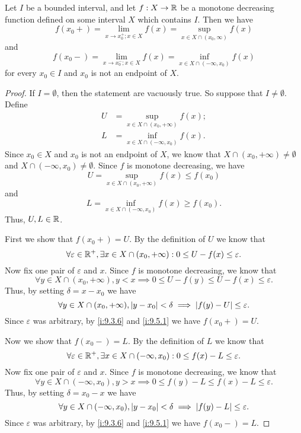 \begin{ac}\label{i:ac:11.8.2}
  Let \(I\) be a bounded interval, and let \(f : X \to \mathbb{R}\) be a monotone decreasing function defined on some interval \(X\) which contains \(I\).
  Then we have
  \[
    f(x_0+) = \lim_{x \to x_0^+ ; x \in X} f(x) = \sup_{x \in X \cap (x_0, \infty)} f(x)
  \]
  and
  \[
    f(x_0-) = \lim_{x \to x_0^- ; x \in X} f(x) = \inf_{x \in X \cap (-\infty, x_0)} f(x)
  \]
  for every \(x_0 \in I\) and \(x_0\) is not an endpoint of \(X\).
\end{ac}

\begin{proof}
  If \(I = \emptyset\), then the statement are vacuously true.
  So suppose that \(I \neq \emptyset\).
  Define
  \begin{align*}
    U & = \sup_{x \in X \cap (x_0, +\infty)} f(x); \\
    L & = \inf_{x \in X \cap (-\infty, x_0)} f(x).
  \end{align*}
  Since \(x_0 \in X\) and \(x_0\) is not an endpoint of \(X\), we know that \(X \cap (x_0, +\infty) \neq \emptyset\) and \(X \cap (-\infty, x_0) \neq \emptyset\).
  Since \(f\) is monotone decreasing, we have
  \[
    U = \sup_{x \in X \cap (x_0, +\infty)} f(x) \leq f(x_0)
  \]
  and
  \[
    L = \inf_{x \in X \cap (-\infty, x_0)} f(x) \geq f(x_0).
  \]
  Thus, \(U, L \in \mathbb{R}\).

  First we show that \(f(x_0+) = U\).
  By the definition of \(U\) we know that
  \[
    \forall \varepsilon \in \mathbb{R}^+, \exists x \in X \cap (x_0, +\infty) : 0 \leq U - f(x) \leq \varepsilon.
  \]
  Now fix one pair of \(\varepsilon\) and \(x\).
  Since \(f\) is monotone decreasing, we know that
  \[
    \forall y \in X \cap (x_0, +\infty), y < x \implies 0 \leq U - f(y) \leq U - f(x) \leq \varepsilon.
  \]
  Thus, by setting \(\delta = x - x_0\) we have
  \[
    \forall y \in X \cap (x_0, +\infty), \left\lvert y - x_0\right\rvert < \delta \implies \left\lvert f(y) - U\right\rvert \leq \varepsilon.
  \]
  Since \(\varepsilon\) was arbitrary, by \cref{i:9.3.6} and \cref{i:9.5.1} we have \(f(x_0+) = U\).

  Now we show that \(f(x_0-) = L\).
  By the definition of \(L\) we know that
  \[
    \forall \varepsilon \in \mathbb{R}^+, \exists x \in X \cap (-\infty, x_0) : 0 \leq f(x) - L \leq \varepsilon.
  \]
  Now fix one pair of \(\varepsilon\) and \(x\).
  Since \(f\) is monotone decreasing, we know that
  \[
    \forall y \in X \cap (-\infty, x_0), y > x \implies 0 \leq f(y) - L \leq f(x) - L \leq \varepsilon.
  \]
  Thus, by setting \(\delta = x_0 - x\) we have
  \[
    \forall y \in X \cap (-\infty, x_0), \left\lvert y - x_0\right\rvert < \delta \implies \left\lvert f(y) - L\right\rvert \leq \varepsilon.
  \]
  Since \(\varepsilon\) was arbitrary, by \cref{i:9.3.6} and \cref{i:9.5.1} we have \(f(x_0-) = L\).
\end{proof}

